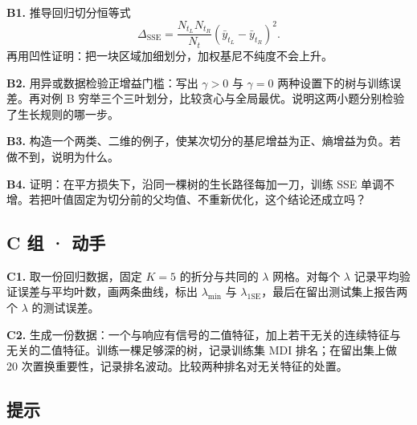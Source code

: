 \documentclass[11pt,a4paper,fontset=windows,zihao=-4]{ctexart}
\DeclareMathOperator{\SSE}{SSE}
\begin{document}
\noindent\textbf{B1.} 推导回归切分恒等式
\[
  \Delta_{\SSE}=\frac{N_{t_L}N_{t_R}}{N_t}(\bar y_{t_L}-\bar y_{t_R})^2 .
\]
再用凹性证明：把一块区域加细划分，加权基尼不纯度不会上升。

\noindent\textbf{B2.} 用异或数据检验正增益门槛：写出 $\gamma>0$ 与 $\gamma=0$ 两种设置下的树与训练误差。再对例 B 穷举三个三叶划分，比较贪心与全局最优。说明这两小题分别检验了生长规则的哪一步。

\noindent\textbf{B3.} 构造一个两类、二维的例子，使某次切分的基尼增益为正、熵增益为负。若做不到，说明为什么。

\noindent\textbf{B4.} 证明：在平方损失下，沿同一棵树的生长路径每加一刀，训练 SSE 单调不增。若把叶值固定为切分前的父均值、不重新优化，这个结论还成立吗？

\subsection*{C 组 · 动手}

\noindent\textbf{C1.} 取一份回归数据，固定 $K=5$ 的折分与共同的 $\lambda$ 网格。对每个 $\lambda$ 记录平均验证误差与平均叶数，画两条曲线，标出 $\lambda_{\min}$ 与 $\lambda_{\mathrm{1SE}}$，最后在留出测试集上报告两个 $\lambda$ 的测试误差。

\noindent\textbf{C2.} 生成一份数据：一个与响应有信号的二值特征，加上若干无关的连续特征与无关的二值特征。训练一棵足够深的树，记录训练集 MDI 排名；在留出集上做 20 次置换重要性，记录排名波动。比较两种排名对无关特征的处置。

\subsection*{提示}
\end{document}
